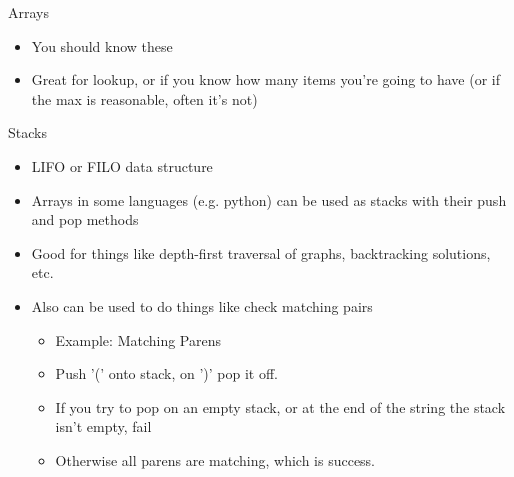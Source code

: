 \documentclass{beamer}
\begin{document}
\begin{frame}{Arrays}
  \begin{centering}
    \begin{itemize}
     \item You should know these
     \item Great for lookup, or if you know how many items you're going to have (or if the max is reasonable, often it's not)
    \end{itemize}
  \end{centering}
\end{frame}


\begin{frame}{Stacks}
  \begin{centering}
    \begin{itemize}
      \item LIFO or FILO data structure
      \item Arrays in some languages (e.g. python) can be used as stacks with their push and pop methods
      \item Good for things like depth-first traversal of graphs, backtracking solutions, etc.
      \item Also can be used to do things like check matching pairs 
      \begin{itemize}
        \item Example: Matching Parens
        \item Push '(' onto stack, on ')' pop it off. 
        \item If you try to pop on an empty stack, or at the end of the string the stack isn't empty, fail
        \item Otherwise all parens are matching, which is success.
      \end{itemize}
    \end{itemize}
  \end{centering}
\end{frame}

\end{document}
